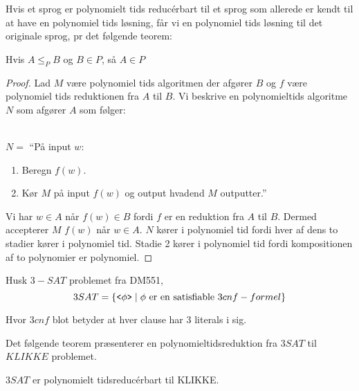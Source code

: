 Hvis et sprog er polynomielt tids reducérbart til et sprog som allerede er kendt til at have en polynomiel tids løsning, får vi en polynomiel tids løsning til det originale sprog, pr det følgende teorem:

\begin{theorem}
Hvis $A \le_{P} B$ og $B \in P$, så $A \in P$
\end{theorem}

\begin{proof}
  Lad $M$ være polynomiel tids algoritmen der afgører $B$ og $f$ være polynomiel tids reduktionen fra $A$ til $B$. Vi beskrive en polynomieltids algoritme $N$ som afgører $A$ som følger:

  \\
  \noindent
  $N = $ ``På input $w$:
  \begin{enumerate}
    \item Beregn $f(w)$.
    \item Kør $M$ på input $f(w)$ og output hvadend $M$ outputter.''
  \end{enumerate}

Vi har $w \in A$ når $f(w) \in B$ fordi $f$ er en reduktion fra $A$ til $B$. Dermed accepterer $M$ $f(w)$ når $w \in A$. $N$ kører i polynomiel tid fordi hver af dens to stadier kører i polynomiel tid. Stadie 2 kører i polynomiel tid fordi kompositionen af to polynomier er polynomiel.
\end{proof}

Husk $3-SAT$ problemet fra DM551,
\begin{equation*}
  3SAT = \{\text{\texttt{<$\phi$>}} \mid \phi \text{ er en satisfiable }3cnf-formel\}
\end{equation*}

Hvor $3cnf$ blot betyder at hver clause har 3 literals i sig.

Det følgende teorem præsenterer en polynomieltidsreduktion fra $3SAT$ til $KLIKKE$ problemet.

\begin{theorem}
$3SAT$ er polynomielt tidsreducérbart til KLIKKE.
\end{theorem}


